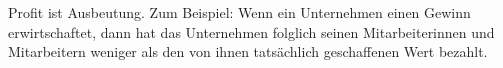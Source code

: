 Profit ist Ausbeutung.
Zum Beispiel: Wenn ein Unternehmen einen Gewinn erwirtschaftet, dann hat das Unternehmen folglich seinen Mitarbeiterinnen und Mitarbeitern weniger als den von ihnen tatsächlich geschaffenen Wert bezahlt.